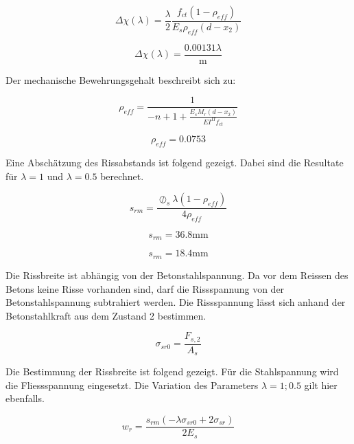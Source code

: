 \documentclass[
  12pt,
  letterpaper,
  egregdoesnotlikesansseriftitles]{scrreprt}
\begin{document}
\begin{equation}\Delta\chi{\left(\lambda \right)} = \frac{\lambda}{2} \frac{f_{ct} \left(1 - \rho_{eff}\right)}{E_{s} \rho_{eff} \left(d - x_{2}\right)}\end{equation}

\begin{equation}\Delta\chi{\left(\lambda \right)} = \frac{0.00131 \lambda}{\text{m}}\end{equation}

Der mechanische Bewehrungsgehalt beschreibt sich zu:

\begin{equation}\rho_{eff} = \frac{1}{- n + 1 + \frac{E_{s} M_{r} \left(d - x_{2}\right)}{EI^{II} f_{ct}}}\end{equation}

\begin{equation}\rho_{eff} = 0.0753\end{equation}

Eine Abschätzung des Rissabstands ist folgend gezeigt. Dabei sind die
Resultate für \(\lambda = 1\) und \(\lambda = 0.5\) berechnet.

\begin{equation}s_{rm} = \frac{\oslash_{s} \lambda \left(1 - \rho_{eff}\right)}{4 \rho_{eff}}\end{equation}

\begin{equation}s_{rm} = 36.8 \text{mm}\end{equation}

\begin{equation}s_{rm} = 18.4 \text{mm}\end{equation}

Die Rissbreite ist abhängig von der Betonstahlspannung. Da vor dem
Reissen des Betons keine Risse vorhanden sind, darf die Rissspannung von
der Betonstahlspannung subtrahiert werden. Die Rissspannung lässt sich
anhand der Betonstahlkraft aus dem Zustand 2 bestimmen.

\begin{equation}\sigma_{sr0} = \frac{F_{s,2}}{A_{s}}\end{equation}

Die Bestimmung der Rissbreite ist folgend gezeigt. Für die Stahlspannung
wird die Fliessspannung eingesetzt. Die Variation des Parameters
\(\lambda = 1 ; 0.5\) gilt hier ebenfalls.

\begin{equation}w_{r} = \frac{s_{rm} \left(- \lambda \sigma_{sr0} + 2 \sigma_{sr}\right)}{2 E_{s}}\end{equation}
\end{document}
